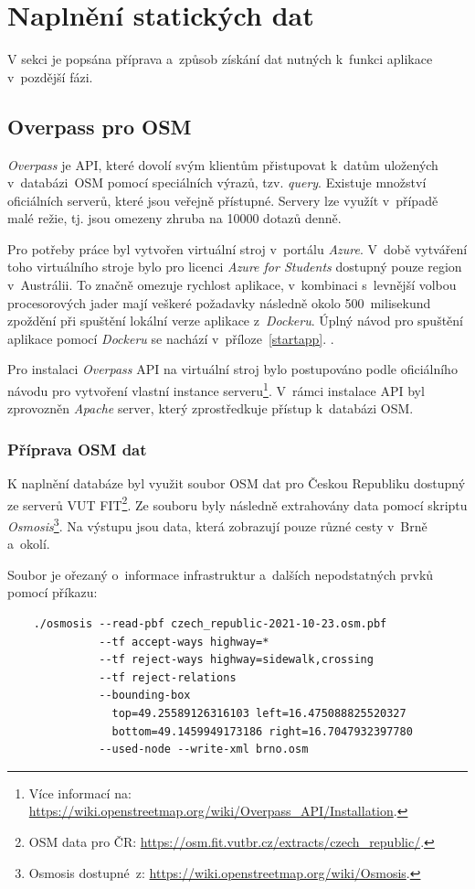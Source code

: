 \section{Naplnění statických dat}
V sekci je popsána příprava a~způsob získání dat nutných k~funkci aplikace v~pozdější fázi.
\subsection{Overpass pro OSM}
\label{overpass}
\emph{Overpass} je API, které dovolí svým klientům přistupovat k~datům uložených v~databázi~OSM pomocí speciálních výrazů, tzv. \emph{query}. Existuje množství oficiálních serverů, které jsou veřejně přístupné. Servery lze využít v~případě malé režie, tj. jsou omezeny zhruba na 10000 dotazů denně.~\cite{OSMAPI}

Pro potřeby práce byl vytvořen virtuální stroj v~portálu \emph{Azure}. V~době vytváření toho virtuálního stroje bylo pro licenci \emph{Azure for Students} dostupný pouze region v~Austrálii. To značně omezuje rychlost aplikace, v~kombinaci s~levnější volbou procesorových jader mají veškeré požadavky následně okolo 500~milisekund zpoždění při spuštění lokální verze aplikace z~\emph{Dockeru}. Úplný návod pro spuštění aplikace pomocí \emph{Dockeru} se nachází v~příloze~\ref{startapp}. \cite{azure}. 

Pro instalaci \emph{Overpass} API na virtuální stroj bylo postupováno podle oficiálního návodu pro vytvoření vlastní instance serveru\footnote{Více informací na: \url{https://wiki.openstreetmap.org/wiki/Overpass_API/Installation}.}. V~rámci instalace API byl zprovozněn \emph{Apache} server, který zprostředkuje přístup k~databázi OSM.~\cite{apache}

\subsubsection{Příprava OSM dat}
K naplnění databáze byl využit soubor OSM dat pro Českou Republiku dostupný ze serverů VUT FIT\footnote{OSM data pro ČR: \url{ https://osm.fit.vutbr.cz/extracts/czech_republic/}.}. Ze souboru byly následně extrahovány data pomocí skriptu \emph{Osmosis}\footnote{Osmosis dostupné~z: \url{https://wiki.openstreetmap.org/wiki/Osmosis}.}. Na výstupu jsou data, která zobrazují pouze různé cesty v~Brně a~okolí.

Soubor je ořezaný o~informace infrastruktur a~dalších nepodstatných prvků pomocí příkazu:

\begin{verbatim}
    ./osmosis --read-pbf czech_republic-2021-10-23.osm.pbf  
              --tf accept-ways highway=* 
              --tf reject-ways highway=sidewalk,crossing 
              --tf reject-relations 
              --bounding-box 
                top=49.25589126316103 left=16.475088825520327
                bottom=49.1459949173186 right=16.7047932397780
              --used-node --write-xml brno.osm
\end{verbatim}
